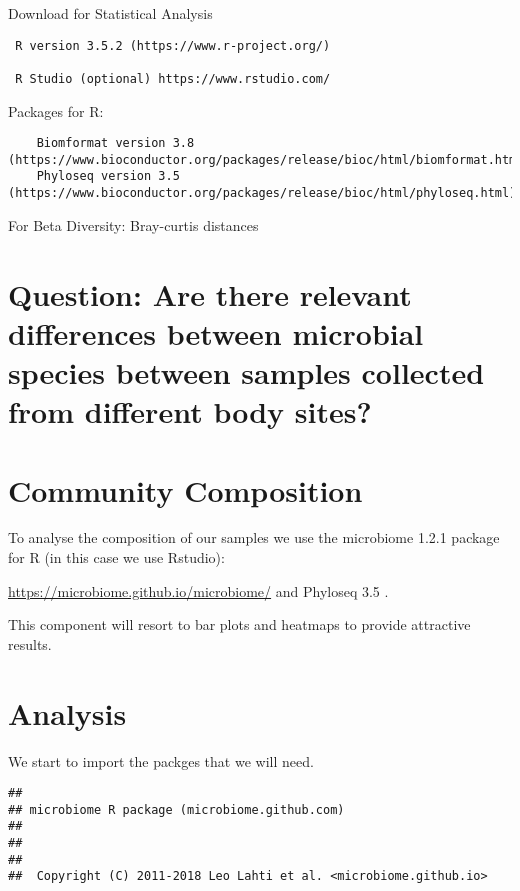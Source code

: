 \documentclass[]{article}
\begin{document}
Download for Statistical Analysis

\begin{verbatim}
 R version 3.5.2 (https://www.r-project.org/)

 R Studio (optional) https://www.rstudio.com/
\end{verbatim}

Packages for R:

\begin{verbatim}
    Biomformat version 3.8 (https://www.bioconductor.org/packages/release/bioc/html/biomformat.html)
    Phyloseq version 3.5 (https://www.bioconductor.org/packages/release/bioc/html/phyloseq.html)
\end{verbatim}

For Beta Diversity: Bray-curtis distances

\hypertarget{question-are-there-relevant-differences-between-microbial-species-between-samples-collected-from-different-body-sites}{%
\section{Question: Are there relevant differences between microbial
species between samples collected from different body
sites?}\label{question-are-there-relevant-differences-between-microbial-species-between-samples-collected-from-different-body-sites}}

\hypertarget{community-composition}{%
\section{Community Composition}\label{community-composition}}

To analyse the composition of our samples we use the microbiome 1.2.1
package for R (in this case we use Rstudio):

\url{https://microbiome.github.io/microbiome/} and Phyloseq 3.5 .

This component will resort to bar plots and heatmaps to provide
attractive results.

\hypertarget{analysis}{%
\section{Analysis}\label{analysis}}

We start to import the packges that we will need.

\begin{verbatim}
## 
## microbiome R package (microbiome.github.com)
##     
## 
## 
##  Copyright (C) 2011-2018 Leo Lahti et al. <microbiome.github.io>
\end{verbatim}
\end{document}
